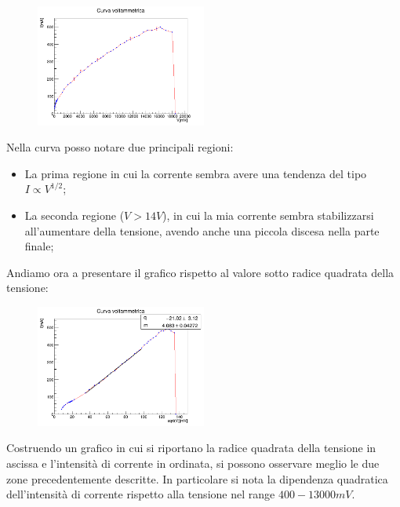 \documentclass[10pt,twocolumn]{article}
\begin{document}
\begin{figure}[H] %
  \centering
  \includegraphics[width=0.5\textwidth]{curva_voltammetrica/curva_voltamperometrica.png} %
  \label{fig:I_V_}
\end{figure}
Nella curva posso notare due principali regioni:
\begin{itemize}
    \item La prima regione in cui la corrente sembra avere una tendenza del tipo $I \propto V^{1/2}$;
    \item La seconda regione ($V > 14V$), in cui la mia corrente sembra stabilizzarsi all'aumentare della tensione, avendo anche una piccola discesa nella parte finale;
\end{itemize}
Andiamo ora a presentare il grafico rispetto al valore sotto radice quadrata della tensione:
\vspace{1.5cm}
\begin{figure}[H] %
  \centering
  \includegraphics[width=0.5\textwidth]{curva_voltammetrica/curva_voltammetrica_sqrt.png} %
  \label{fig:I_V_}
\end{figure}
\noindent Costruendo un grafico in cui si riportano la radice quadrata della tensione in ascissa e l'intensità di corrente in ordinata, si possono osservare meglio le due zone precedentemente descritte.
In particolare si nota la dipendenza quadratica dell'intensità di corrente rispetto alla tensione nel range $400-13000mV$.\\ 
\end{document}
